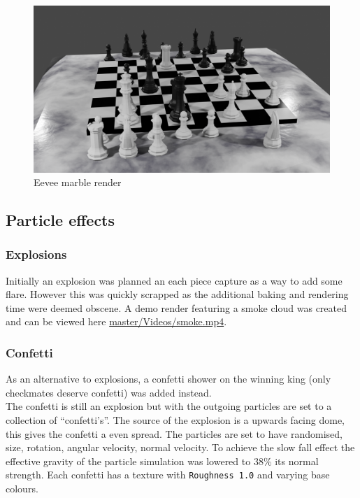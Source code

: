 \documentclass[11pt]{article}
\begin{document}
\begin{figure}[htbp]
\centering
\includegraphics[width=\textwidth]{Images/Marble eevee.png}
\caption{Eevee marble render}
\end{figure}
\newpage
\subsection{Particle effects}
\label{sec:org03a7730}
\subsubsection{Explosions}
\label{sec:org759e9ca}
Initially an explosion was planned an each piece capture as a way to add some
flare. However this was quickly scrapped as the additional baking and rendering time
were deemed obscene. A demo render featuring a smoke cloud was created and can
be viewed here \href{https://github.com/Jake-Moss/blender-chess/blob/master/Videos/smoke.mp4}{master/Videos/smoke.mp4}.
\subsubsection{Confetti}
\label{sec:org33e24c3}
As an alternative to explosions, a confetti shower on the winning king (only
checkmates deserve confetti) was added instead.\\

The confetti is still an explosion but with the outgoing particles are set to a
collection of ``confetti's''. The source of the explosion is a upwards facing
dome, this gives the confetti a even spread. The particles are set to have
randomised, size, rotation, angular velocity, normal velocity. To achieve the
slow fall effect the effective gravity of the particle simulation was lowered to
38\% its normal strength. Each confetti has a texture with \texttt{Roughness 1.0} and
varying base colours.
\end{document}
